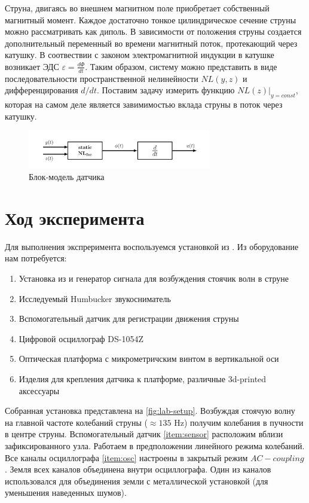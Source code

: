 \documentclass{article}
\begin{document}
Струна, двигаясь во внешнем магнитном поле приобретает собственный магнитный момент.
Каждое достаточно тонкое цилиндрическое сечение струны можно рассматривать как диполь. В зависимости от положения струны
создается дополнительный переменный во времени магнитный поток, протекающий через катушку. В соотвествии с законом
электромагнитной индукции в катушке возникает ЭДС $\varepsilon = \frac{d\Phi}{dt}$. Таким образом, систему можно
представить в виде последовательности пространственной нелинейности $NL(y, z)$ и дифференцирования $d/dt$. Поставим задачу
измерить функцию $NL(z)\vert_{y = const}$, которая на самом деле является завимимостью вклада струны в поток через катушку.

\begin{figure}[h]
    \centering
    \includegraphics[width=8cm]{drawings/model.png}
    \caption{Блок-модель датчика}
    \label{fig:model}
\end{figure}

\section{Ход эксперимента}

Для выполнения экспреримента воспользуемся установкой из \cite{string-lab}. Из оборудование нам потребуется:

\begin{enumerate}
    \item Установка из \cite{string-lab} и генератор сигнала для возбуждения стоячик волн в струне \label{item:generator}
    \item Исследуемый Humbucker звукосниматель
    \item Вспомогательный датчик для регистрации движения струны \label{item:sensor}
    \item Цифровой осциллограф DS-1054Z \label{item:osc}
    \item Оптическая платформа с микрометричским винтом в вертикальной оси
    \item Изделия для крепления датчика к платформе, различные 3d-printed аксессуары
\end{enumerate}

Собранная установка представлена на \ref{fig:lab-setup}.
Возбуждая стоячую волну на главной частоте колебаний струны ($\approx 135$ Hz) получим колебания в пучности в центре струны.
Вспомогательный датчик \ref{item:sensor} расположим вблизи зафиксированного узла. Работаем в предположении линейного режима
колебаний. Все каналы осциллографа \ref{item:osc} настроены в закрытый режим $AC-coupling$. Земля всех каналов объединена внутри
осциллографа. Один из каналов использовался для объединения земли с металлической установкой (для уменьшения наведенных шумов).
\end{document}
